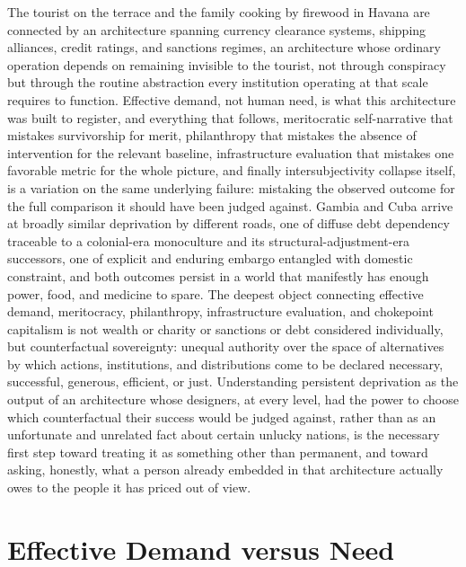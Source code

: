 \documentclass[11pt]{article}
\begin{document}
The tourist on the terrace and the family cooking by firewood in Havana are connected by an architecture spanning currency clearance systems, shipping alliances, credit ratings, and sanctions regimes, an architecture whose ordinary operation depends on remaining invisible to the tourist, not through conspiracy but through the routine abstraction every institution operating at that scale requires to function. Effective demand, not human need, is what this architecture was built to register, and everything that follows, meritocratic self-narrative that mistakes survivorship for merit, philanthropy that mistakes the absence of intervention for the relevant baseline, infrastructure evaluation that mistakes one favorable metric for the whole picture, and finally intersubjectivity collapse itself, is a variation on the same underlying failure: mistaking the observed outcome for the full comparison it should have been judged against. Gambia and Cuba arrive at broadly similar deprivation by different roads, one of diffuse debt dependency traceable to a colonial-era monoculture and its structural-adjustment-era successors, one of explicit and enduring embargo entangled with domestic constraint, and both outcomes persist in a world that manifestly has enough power, food, and medicine to spare. The deepest object connecting effective demand, meritocracy, philanthropy, infrastructure evaluation, and chokepoint capitalism is not wealth or charity or sanctions or debt considered individually, but counterfactual sovereignty: unequal authority over the space of alternatives by which actions, institutions, and distributions come to be declared necessary, successful, generous, efficient, or just. Understanding persistent deprivation as the output of an architecture whose designers, at every level, had the power to choose which counterfactual their success would be judged against, rather than as an unfortunate and unrelated fact about certain unlucky nations, is the necessary first step toward treating it as something other than permanent, and toward asking, honestly, what a person already embedded in that architecture actually owes to the people it has priced out of view.

\newpage
\appendix

\section{Effective Demand versus Need}
\end{document}
